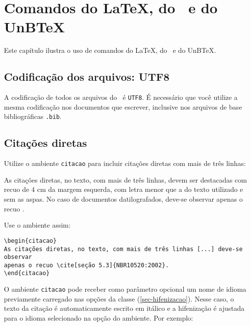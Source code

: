 \chapter{Comandos do \LaTeX, do \abnTeX\ e do UnB\TeX}
\label{cap_exemplos}

Este capítulo ilustra o uso de comandos do \LaTeX, do \abnTeX\ e do UnB\TeX. 

\section{Codificação dos arquivos: UTF8}

A codificação de todos os arquivos do \abnTeX\ é \texttt{UTF8}. É necessário que você utilize a mesma codificação nos documentos que escrever, inclusive nos arquivos de base bibliográficas \verb|.bib|.

\section{Citações diretas}\label{sec-citacao}

Utilize o ambiente \texttt{citacao} para incluir citações diretas com mais de três linhas:

\begin{citacao}
As citações diretas, no texto, com mais de três linhas, devem ser destacadas com recuo de 4 cm da margem esquerda, com letra menor que a do texto utilizado e sem as aspas. No caso de documentos datilografados, deve-se observar apenas o recuo \cite[seção 5.3]{NBR10520:2002}.
\end{citacao}

Use o ambiente assim:

\begin{verbatim}
\begin{citacao}
As citações diretas, no texto, com mais de três linhas [...] deve-se observar
apenas o recuo \cite[seção 5.3]{NBR10520:2002}.
\end{citacao}
\end{verbatim}

O ambiente \texttt{citacao} pode receber como parâmetro opcional um nome de idioma previamente carregado nas opções da classe (\cref{sec-hifenizacao}). Nesse caso, o texto da citação é automaticamente escrito em itálico e a hifenização é ajustada para o idioma selecionado na opção do ambiente. Por exemplo:


